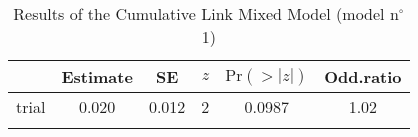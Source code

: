 \begin{table}
\begin{tabular}{lccccc}
  \lsptoprule
 & {Estimate} & {SE} & {$z$} & {$\text{Pr}(>|z|)$} & {Odd.ratio} \\ 
  \midrule
  trial & 0.020 & 0.012 & 2 & 0.0987 & 1.02 \\ 
   \lspbottomrule
\end{tabular}
\caption{Results of the Cumulative Link Mixed Model (model n$^{\circ}$1)}
\label{tab:exp12-m1}
\end{table}
